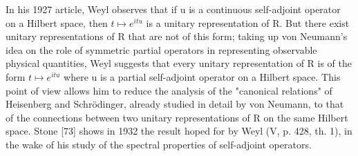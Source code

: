 In his 1927 article, Weyl observes that if u is a continuous self-adjoint operator on a Hilbert space, then \(t \mapsto e^{itu}\) is a unitary representation of R. But there exist unitary representations of R that are not of this form; taking up von Neumann's idea on the role of symmetric partial operators in representing observable physical quantities, Weyl suggests that every unitary representation of R is of the form \(t \mapsto e^{itu}\) where u is a partial self-adjoint operator on a Hilbert space. This point of view allows him to reduce the analysis of the "canonical relations" of Heisenberg and Schrödinger, already studied in detail by von Neumann, to that of the connections between two unitary representations of R on the same Hilbert space. Stone {[}73{]} shows in 1932 the result hoped for by Weyl (V, p. 428, th. 1), in the wake of his study of the spectral properties of self-adjoint operators.

